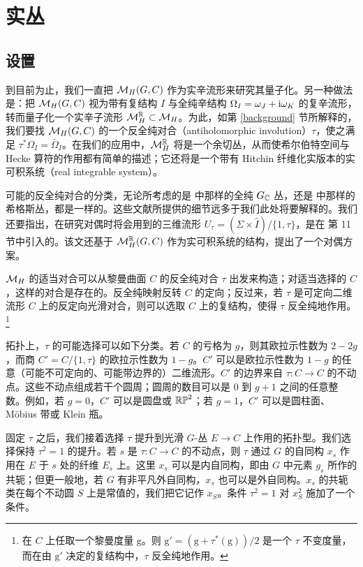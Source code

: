 
\section{实丛}\label{realb}

\subsection{设置}\label{setup}

到目前为止，我们一直把 $\M_H(G,C)$ 作为实辛流形来研究其量子化。另一种做法是：把 $\M_H(G,C)$ 视为带有复结构 $I$ 与全纯辛结构 $\Omega_I=\omega_J+\i \omega_K$ 的复辛流形，转而量子化一个实辛子流形 $\M_H^\R \subset \M_H$。为此，如第 \ref{background} 节所解释的，我们要找 $\M_H(G,C)$ 的一个反全纯对合（antiholomorphic involution）$\tau$，使之满足 $\tau^*\Omega_I=\bar\Omega_I$。在我们的应用中，$\M_H^\R$ 将是一个余切丛，从而使希尔伯特空间与 Hecke 算符的作用都有简单的描述；它还将是一个带有 Hitchin 纤维化实版本的实可积系统（real integrable system）。

可能的反全纯对合的分类，无论所考虑的是 \cite{Hurtu,Hurtu2} 中那样的全纯 $G_\C$ 丛，还是 \cite{BaSc,BaSc2,BG} 中那样的希格斯丛，都是一样的。这些文献所提供的细节远多于我们此处将要解释的。我们还要指出，在研究对偶时将会用到的三维流形 $U_\tau=(\Sigma\times \hat I)/\{1,\tau\}$，是在 \cite{BaSc} 第 11 节中引入的。该文还基于 $\M_H^\R(G,C)$ 作为实可积系统的结构，提出了一个对偶方案。

$\M_H$ 的适当对合可以从黎曼曲面 $C$ 的反全纯对合 $\tau$ 出发来构造；对适当选择的 $C$，这样的对合是存在的。反全纯映射反转 $C$ 的定向；反过来，若 $\tau$ 是可定向二维流形 $C$ 上的反定向光滑对合，则可以选取 $C$ 上的复结构，使得 $\tau$ 反全纯地作用。\footnote{在 $C$ 上任取一个黎曼度量 $\mathrm g$。则 $\mathrm g'=(\mathrm g+\tau^*(\mathrm g))/2$ 是一个 $\tau$ 不变度量，而在由 $\mathrm g'$ 决定的复结构中，$\tau$ 反全纯地作用。}

拓扑上，$\tau$ 的可能选择可以如下分类。若 $C$ 的亏格为 $g$，则其欧拉示性数为 $2-2g$，而商 $C'=C/\{1,\tau\}$ 的欧拉示性数为 $1-g$。$C'$ 可以是欧拉示性数为 $1-g$ 的任意（可能不可定向的、可能带边界的）二维流形。$C'$ 的边界来自 $\tau:C\to C$ 的不动点。这些不动点组成若干个圆周；圆周的数目可以是 $0$ 到 $g+1$ 之间的任意整数。例如，若 $g=0$，$C'$ 可以是圆盘或 $\Bbb{RP}^2$；若 $g=1$，$C'$ 可以是圆柱面、Möbius 带或 Klein 瓶。

固定 $\tau$ 之后，我们接着选择 $\tau$ 提升到光滑 $G$-丛 $E\to C$ 上作用的拓扑型。我们选择保持 $\tau^2=1$ 的提升。若 $s$ 是 $\tau:C\to C$ 的不动点，则 $\tau$ 通过 $G$ 的自同构 $x_s$ 作用在 $E$ 于 $s$ 处的纤维 $E_s$ 上。这里 $x_s$ 可以是内自同构，即由 $G$ 中元素 $g_s$ 所作的共轭；但更一般地，若 $G$ 有非平凡外自同构，$x_s$ 也可以是外自同构。$x_s$ 的共轭类在每个不动圆 $S$ 上是常值的，我们把它记作 $x_S$。条件 $\tau^2=1$ 对 $x_S^2$ 施加了一个条件。

